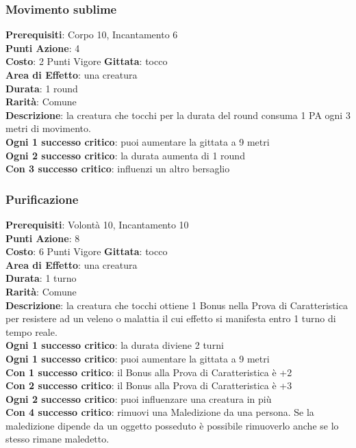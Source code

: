 \documentclass[12pt,a4paper,twoside,openany]{book}
\begin{document}
\begin{multicols}{2}
\subsubsection*{Movimento sublime}
\textbf{Prerequisiti}: Corpo 10, Incantamento 6\\
\textbf{Punti Azione}: 4\\
\textbf{Costo}: 2 Punti Vigore
\textbf{Gittata}: tocco \\
\textbf{Area di Effetto}: una creatura\\
\textbf{Durata}: 1 round\\
\textbf{Rarità}: Comune\\
\textbf{Descrizione}: la creatura che tocchi per la durata del round consuma 1 PA ogni 3 metri di movimento.\\
\textbf{Ogni 1 successo critico}: puoi aumentare la gittata a 9 metri\\
\textbf{Ogni 2 successo critico}: la durata aumenta di 1 round\\
\textbf{Con 3 successo critico}: influenzi un altro bersaglio \\

\subsubsection*{Purificazione}
\textbf{Prerequisiti}: Volontà 10, Incantamento 10\\
\textbf{Punti Azione}: 8\\
\textbf{Costo}: 6 Punti Vigore
\textbf{Gittata}: tocco \\
\textbf{Area di Effetto}: una creatura\\
\textbf{Durata}: 1 turno\\
\textbf{Rarità}: Comune\\
\textbf{Descrizione}: la creatura che tocchi ottiene 1 Bonus nella Prova di Caratteristica per resistere ad un veleno o malattia il cui effetto si manifesta entro 1 turno di tempo reale.\\
\textbf{Ogni 1 successo critico}: la durata diviene 2 turni\\
\textbf{Ogni 1 successo critico}: puoi aumentare la gittata a 9 metri\\
\textbf{Con 1 successo critico}: il Bonus alla Prova di Caratteristica è +2\\
\textbf{Con 2 successo critico}: il Bonus alla Prova di Caratteristica è +3\\
\textbf{Ogni 2 successo critico}: puoi influenzare una creatura in più\\
\textbf{Con 4 successo critico}: rimuovi una Maledizione da una persona. Se la maledizione dipende da un oggetto posseduto è possibile rimuoverlo anche se lo stesso rimane maledetto. 


\end{multicols}
\end{document}
